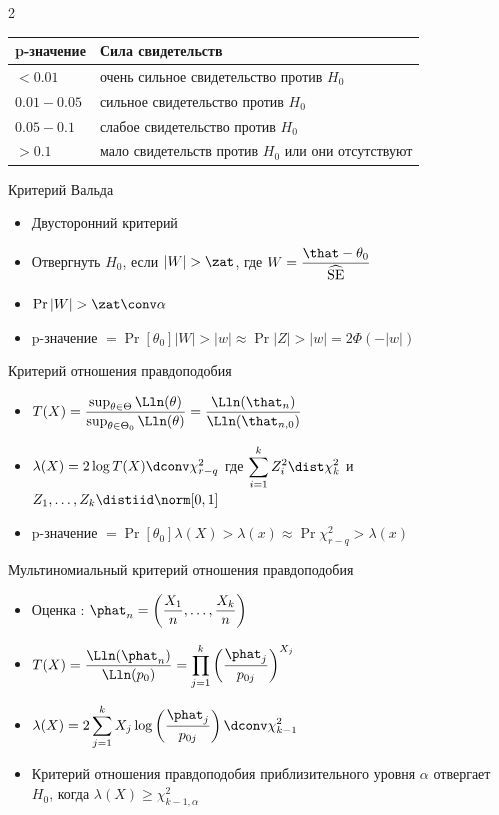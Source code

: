 \documentclass[landscape]{article}
\def\sehat{\ensuremath{\widehat{\mathrm{SE}}}}
\newenvironment{titemize}[1]{
  \begin{minipage}[h]{\columnwidth}
    #1
    \begin{itemize}
}{
    \end{itemize}
  \end{minipage}
}
\begin{document}
\begin{multicols*}{2}
\centering
\begin{tabular}{ll}
  \textbf{p-значение} & \textbf{Сила свидетельств} \\
  \hline
  $< 0.01$      & очень сильное свидетельство против $H_0$ \\
  $0.01 - 0.05$ & сильное свидетельство против $H_0$ \\
  $0.05 - 0.1$  & слабое свидетельство против $H_0$ \\
  $> 0.1$       & мало свидетельств против $H_0$ или они отсутствуют \\
\end{tabular}

\raggedright
Критерий Вальда
\begin{itemize}
  \item Двусторонний критерий
  \item Отвергнуть $H_0$, если $|W| > \zat$, где
    $W = \displaystyle\frac{\that - \theta_0}{\sehat}$
  \item $\Pr{|W| > \zat} \conv \alpha$
  \item p-значение $= \Pr[\theta_0]{|W| > |w|}
                 \approx \Pr{|Z| > |w|}
                 = 2\Phi(-|w|)$
\end{itemize}

Критерий отношения правдоподобия
\begin{itemize}
 \item $T(X) = \displaystyle\frac{\sup_{\theta\in\Theta}\Lln(\theta)}%
                                 {\sup_{\theta\in\Theta_0}\Lln(\theta)}
             = \frac{\Lln(\that_n)}{\Lln(\that_{n,0})}$
 \item $\lambda(X) = 2\log T(X) \dconv \chi_{r-q}^2$
   где $\displaystyle\sum_{i=1}^k Z_i^2 \dist \chi_k^2$ и
    $Z_1,\dots,Z_k \distiid \norm[0,1]$
  \item p-значение $= \Pr[\theta_0]{\lambda(X) > \lambda(x)}
                 \approx \Pr{\chi_{r-q}^2 > \lambda(x)}$
\end{itemize}

\begin{titemize}{Мультиномиальный критерий отношения правдоподобия}
  \item Оценка \mle:
    $\phat_n = \displaystyle \left(\frac{X_1}{n},\dots,\frac{X_k}{n}\right)$
 \item $T(X) = \displaystyle \frac{\Lln(\phat_n)}{\Lln(p_0)}
   = \prod_{j=1}^k \left( \frac{\phat_j}{p_{0j}} \right)^{X_j}$
 \item $\lambda(X) = \displaystyle 2\sum_{j=1}^k X_j \log
    \left( \frac{\phat_j}{p_{0j}} \right) \dconv \chi_{k-1}^2$
 \item Критерий отношения правдоподобия приблизительного уровня $\alpha$ отвергает $H_0$,
  когда $\lambda(X) \ge \chi_{k-1,\alpha}^2$
\end{titemize}


\end{multicols*}
\end{document}
